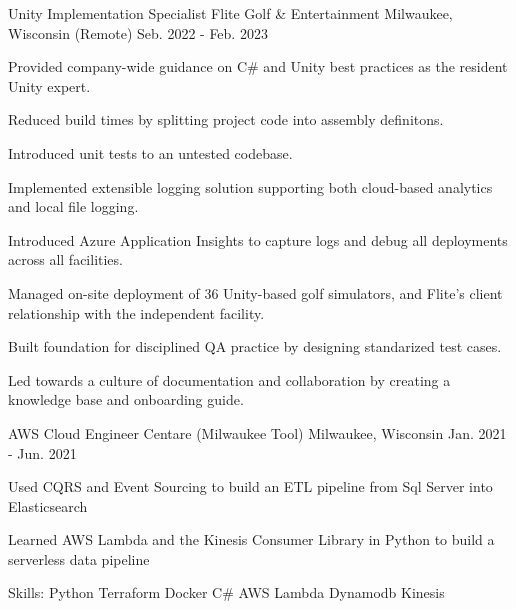 \begin{cventries}
  \cventry
    {Unity Implementation Specialist} %
    {Flite Golf \& Entertainment} %
    {Milwaukee, Wisconsin (Remote)} %
    {Seb. 2022 - Feb. 2023} %
    {
      \begin{cvitems} %
        \item {Provided company-wide guidance on C\# and Unity best practices as the resident Unity expert.}
        \item {Reduced build times by splitting project code into assembly definitons.}
        \item {Introduced unit tests to an untested codebase.}
        \item {Implemented extensible logging solution supporting both cloud-based analytics and local file logging.}
        \item {Introduced Azure Application Insights to capture logs and debug all deployments across all facilities.}
        \item {Managed on-site deployment of 36 Unity-based golf simulators, and Flite's client relationship with the independent facility.}
        \item {Built foundation for disciplined QA practice by designing standarized test cases.}
        \item {Led towards a culture of documentation and collaboration by creating a knowledge base and onboarding guide.}
      \end{cvitems}
    }

  \cventry
    {AWS Cloud Engineer} %
    {Centare (Milwaukee Tool)} %
    {Milwaukee, Wisconsin} %
    {Jan. 2021 - Jun. 2021} %
    {
      \begin{cvitems} %
        \item {Used CQRS and Event Sourcing to build an ETL pipeline from Sql Server into Elasticsearch}
        \item {Learned AWS Lambda and the Kinesis Consumer Library in Python to build a serverless data pipeline}
        \item {Skills: Python \textbullet{} Terraform \textbullet{} Docker \textbullet{} C\# \textbullet{} AWS Lambda \textbullet{} Dynamodb \textbullet{} Kinesis}
      \end{cvitems}
    }


\end{cventries}
